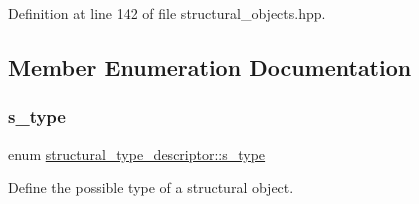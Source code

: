 Definition at line 142 of file structural\+\_\+objects.\+hpp.



\subsection{Member Enumeration Documentation}
\mbox{\label{structstructural__type__descriptor_ae12552f84c02a972c2a084901b94cd13}} 
\subsubsection{\texorpdfstring{s\+\_\+type}{s\_type}}
{\footnotesize\ttfamily enum \hyperlink{structstructural__type__descriptor_ae12552f84c02a972c2a084901b94cd13}{structural\+\_\+type\+\_\+descriptor\+::s\+\_\+type}}



Define the possible type of a structural object. 

